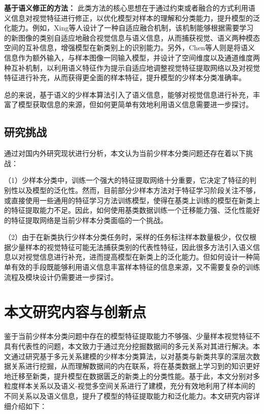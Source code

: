 \textbf{基于语义修正的方法：} 此类方法的核心思想在于通过约束或者融合的方式利用语义信息对视觉特征进行修正，以优化模型对样本的理解和分类能力，提升模型的泛化能力。例如，Xing等人\cite{AM3}设计了一种自适应融合机制，该机制能够根据需要学习的新图像的类别自适应地融合视觉信息与语义信息，从而捕获视觉、语义两种模态空间的互补信息，增强模型在新类别上的识别能力。另外，Chen等人\cite{SP-CLIP}则是将语义信息作为额外输入，与样本图像一同输入模型，并设计了空间维度以及通道维度两种互补机制，以利用语义特征作为提示自适应地调整视觉特征提取网络以及对视觉特征进行补充，从而获得更全面的样本特征，提升模型的少样本分类准确率。

总的来说，基于语义的少样本算法引入了语义信息，能够对视觉信息进行补充，丰富了模型获取信息的来源，但如何更简单有效地利用语义信息需要进一步探讨。

\subsection[\hspace{-2pt}研究挑战]{{\heiti{} \hspace{-8pt}研究挑战}}\label{section1: 研究挑战}

通过对国内外研究现状进行分析，本文认为当前少样本分类问题还存在着以下挑战：

（1）少样本分类中，训练一个强大的特征提取网络十分重要，它决定了特征的判别性以及模型的泛化性。然而，目前部分少样本方法对于特征学习阶段关注不够，或直接使用一些通用的特征学习方法训练模型，使得在基类上训练的模型在新类上的特征提取能力不足。因此，如何使用基类数据训练一个迁移能力强、泛化性能好的特征提取网络是当前少样本分类面临的一个挑战。

（2）由于在新类执行少样本分类任务时，采样的任务标注样本数量极少，仅仅根据少量样本的视觉特征可能无法捕获类别的代表性特征，因此很多方法引入语义信息以对视觉信息进行补充，进而提高模型在新类上的泛化能力。但如何设计一种简单有效的手段既能够利用语义信息丰富样本特征的信息来源，又不需要复杂的训练流程及模块设计仍需要进一步探讨。

\section[\hspace{-2pt}本文研究内容与创新点]{{\heiti{} \hspace{-8pt}本文研究内容与创新点}}\label{section1: 本文研究内容与创新点}

鉴于当前少样本分类问题中存在的模型特征提取能力不够强、少量样本视觉特征不具有代表性的问题，本文致力于通过充分挖掘数据间的多元关系对其进行解决。本文通过研究基于多元关系建模的少样本分类算法，以对基类与新类共享的深层次数据关系进行挖掘，从而理解数据间的内在联系，将在基类数据上学习到的知识更好地迁移至新类，提升模型在数据匮乏的新类上的分类性能。基于此，本文分别对多粒度样本关系以及语义-视觉多空间关系进行了建模，充分有效地利用了样本间的不同关系以及语义信息，提升了模型的特征提取能力和泛化能力。本文研究内容详细介绍如下：

